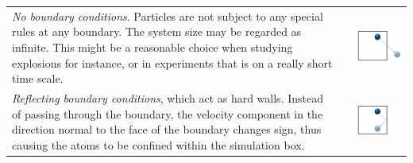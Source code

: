 \documentclass[twoside,english]{uiofysmaster}
\begin{document}
\hspace{-9.37mm}
\begin{tabular}{p{} p{}}
	\vspace{0pt}  {\it No boundary conditions}. Particles are not subject to any special rules at any boundary. 
	The system size may be regarded as infinite. 
	This  might be a reasonable choice when studying explosions for instance, or in experiments that is on a really short time scale.  
	& \vspace{0pt} \hspace*{-1.3cm} \includegraphics[width=1.3\linewidth]{figures/BoundaryConditions/no.pdf} 
	\\*
	\vspace{0pt} {\it Reflecting boundary conditions}, which act as hard walls. Instead of passing through the boundary, the velocity component in the direction normal to the face of the boundary changes sign, thus causing the atoms to be confined within the simulation box. 
	& \vspace{0pt} \hspace*{-1.3cm} \includegraphics[width=1.3\linewidth]{figures/BoundaryConditions/reflecting.pdf} 
	\\*

\end{tabular}
\end{document}
